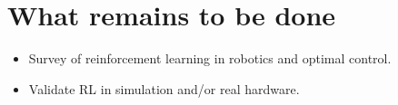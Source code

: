 \documentclass[10pt]{article}
\begin{document}
\section{What remains to be done}
\begin{itemize}
\item Survey of reinforcement learning in robotics and optimal control. 
\item Validate RL in simulation and/or real hardware.
\end{itemize}

\nocite{yang_multiagent_2004}
\nocite{kim_autonomous_2003}
\nocite{mohri_foundations_2012}


\newpage
{}





\end{document}
